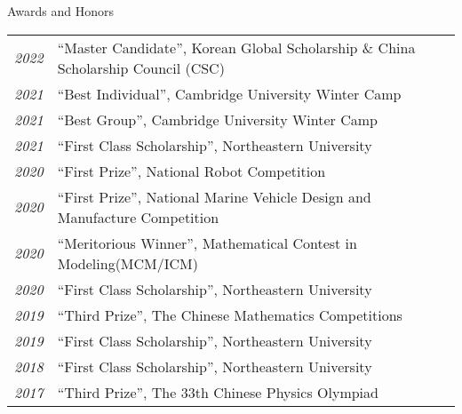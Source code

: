 \begin{rSection}{Awards and Honors}
    \begin{tabular}{ @{} >{\itshape}l @{\hspace{6ex}} l }
    2022		& ``Master Candidate'', Korean Global Scholarship \& China Scholarship Council (CSC) \\
    2021        & ``Best Individual'', Cambridge University Winter Camp\\  
    2021        & ``Best Group'', Cambridge University Winter Camp\\  
    2021        & ``First Class Scholarship'', Northeastern University\\
    2020        & ``First Prize'', National Robot Competition\\
    2020        & ``First Prize'', National Marine Vehicle Design and Manufacture Competition\\
    2020        & ``Meritorious Winner'', Mathematical Contest in Modeling(MCM/ICM)\\
    2020        & ``First Class Scholarship'', Northeastern University\\
    2019        & ``Third Prize'', The Chinese Mathematics Competitions\\
    2019        & ``First Class Scholarship'', Northeastern University\\
    2018        & ``First Class Scholarship'', Northeastern University\\
	2017        & ``Third Prize'', The 33th Chinese Physics Olympiad\\
    \end{tabular}
\end{rSection}
